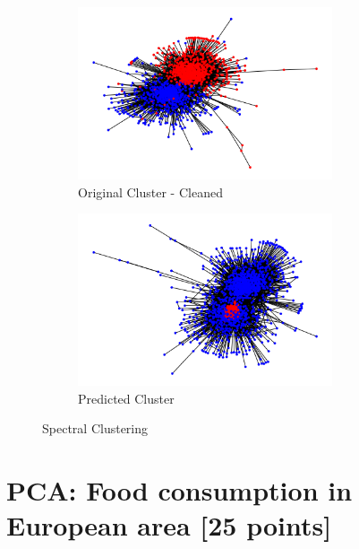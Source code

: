 \documentclass[twoside,10pt]{article}
\begin{document}
 \begin{figure}
    \begin{subfigure}{.5\textwidth}
  \centering
  \includegraphics[height=2in]{Images/InitialClusterCleaned.png}  
  \caption{Original Cluster - Cleaned}
  \label{fig:sub-first}
\end{subfigure}
\begin{subfigure}{.5\textwidth}
  \centering
  \includegraphics[height=2in]{Images/PredictedCluster.png}  
  \caption{Predicted Cluster}
  \label{fig:sub-first}
\end{subfigure}


\caption{Spectral Clustering}
\label{fig:fig}
\end{figure}

\section{PCA: Food consumption in European area [25 points]}
\end{document}
